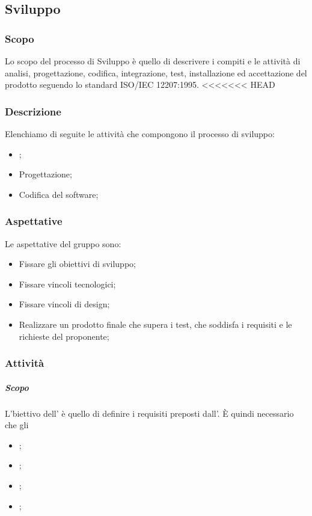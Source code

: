 \subsection{Sviluppo}
\subsubsection{Scopo}
Lo scopo del processo di Sviluppo è quello di descrivere i compiti e le attività di analisi, progettazione, codifica, integrazione, test, installazione ed accettazione del prodotto seguendo lo standard ISO/IEC 12207:1995.
<<<<<<< HEAD
\subsubsection{Descrizione}
Elenchiamo di seguite le attività che compongono il processo di sviluppo:
\begin{itemize}
    \item{\AdR{};}
    \item{Progettazione;}
    \item{Codifica del software;}
\end{itemize}

\subsubsection{Aspettative}
Le aspettative del gruppo sono:
\begin{itemize}
    \item{Fissare gli obiettivi di sviluppo;}
    \item{Fissare vincoli tecnologici;}
    \item{Fissare vincoli di design;}
    \item{Realizzare un prodotto finale che supera i test, che soddisfa i requisiti e le richieste del proponente;}
\end{itemize}

\subsubsection{Attività}
\paragraph{\AdR{}}
\subparagraph{Scopo} L'biettivo dell'\AdRv{} è quello di definire i requisiti preposti dall'\proponProg{}. È quindi necessario che gli \analProg
\begin{itemize}
    \item{;}
    \item{;}
    \item{;}
    \item{;}
\end{itemize}




